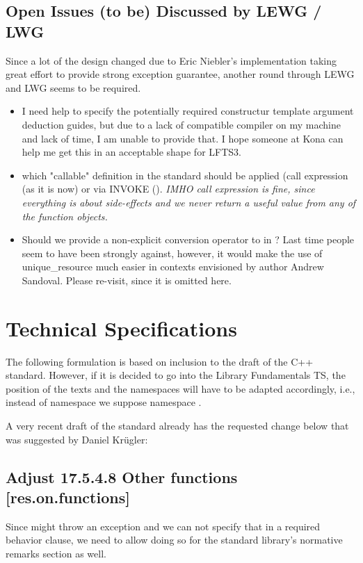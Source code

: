 \documentclass[ebook,11pt,article]{memoir}
\begin{document}
\section{Open Issues (to be) Discussed by LEWG / LWG}
Since a lot of the design changed due to Eric Niebler's implementation taking great effort to provide strong exception guarantee, another round through LEWG and LWG seems to be required.
\begin{itemize}
\item I need help to specify the potentially required constructur template argument deduction guides, but due to a lack of compatible compiler on my machine and lack of time, I am unable to provide that.
I hope someone at Kona can help me get this in an acceptable shape for LFTS3.
\item which "callable" definition in the standard should be applied (call expression (as it is now) or via INVOKE (). 
\emph{IMHO call expression is fine, since everything is about side-effects and we never return a useful value from any of the function objects.}
\item Should we provide a non-explicit conversion operator to  in  ? Last time people seem to have been strongly against, however, it would make the use of unique_resource much easier in contexts envisioned by author Andrew Sandoval. Please re-visit, since it is omitted here.
\end{itemize}

\newpage
\chapter{Technical Specifications}
The following formulation is based on inclusion to the draft of the C++ standard. However, if it is decided to go into the Library Fundamentals TS, the position of the texts and the namespaces will have to be adapted accordingly, i.e., instead of namespace  we suppose namespace . 

A very recent draft of the standard already has the requested change below that was suggested by Daniel Kr\"ugler:

\section{Adjust 17.5.4.8 Other functions [res.on.functions]}
Since  might throw an exception and we can not specify that in a required behavior clause, we need to allow doing so for the standard library's normative remarks section as well.
\end{document}

